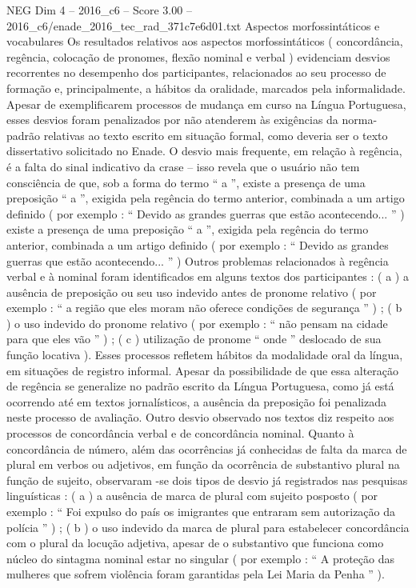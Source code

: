 \begin{textsample}{NEG Dim 4 – 2016\_c6 – Score 3.00 – 2016\_c6/enade\_2016\_tec\_rad\_371c7e6d01.txt}
Aspectos morfossintáticos e vocabulares Os resultados relativos aos aspectos morfossintáticos ( concordância, regência, colocação de pronomes, flexão nominal e verbal ) evidenciam desvios recorrentes no desempenho dos participantes, relacionados ao seu processo de formação e, principalmente, a hábitos da oralidade, marcados pela informalidade.
Apesar de exemplificarem processos de mudança em curso na Língua Portuguesa, esses desvios foram penalizados por não atenderem às exigências da norma-padrão relativas ao texto escrito em situação formal, como deveria ser o texto dissertativo solicitado no Enade.
O desvio mais frequente, em relação à regência, é a falta do sinal indicativo da crase – isso revela que o usuário não tem consciência de que, sob a forma do termo “ a ”, existe a presença de uma preposição “ a ”, exigida pela regência do termo anterior, combinada a um artigo definido ( por exemplo : “ Devido as grandes guerras que estão acontecendo... ” ) existe a presença de uma preposição “ a ”, exigida pela regência do termo anterior, combinada a um artigo definido ( por exemplo : “ Devido as grandes guerras que estão acontecendo... ” ) Outros problemas relacionados à regência verbal e à nominal foram identificados em alguns textos dos participantes : ( a ) a ausência de preposição ou seu uso indevido antes de pronome relativo ( por exemplo : “ a região que eles moram não oferece condições de segurança ” ) ; ( b ) o uso indevido do pronome relativo ( por exemplo : “ não pensam na cidade para que eles vão ” ) ; ( c ) utilização de pronome “ onde ” deslocado de sua função locativa ).
Esses processos refletem hábitos da modalidade oral da língua, em situações de registro informal.
Apesar da possibilidade de que essa alteração de regência se generalize no padrão escrito da Língua Portuguesa, como já está ocorrendo até em textos jornalísticos, a ausência da preposição foi penalizada neste processo de avaliação.
Outro desvio observado nos textos diz respeito aos processos de concordância verbal e de concordância nominal.
Quanto à concordância de número, além das ocorrências já conhecidas de falta da marca de plural em verbos ou adjetivos, em função da ocorrência de substantivo plural na função de sujeito, observaram -se dois tipos de desvio já registrados nas pesquisas linguísticas : ( a ) a ausência de marca de plural com sujeito posposto ( por exemplo : “ Foi expulso do país os imigrantes que entraram sem autorização da polícia ” ) ; ( b ) o uso indevido da marca de plural para estabelecer concordância com o plural da locução adjetiva, apesar de o substantivo que funciona como núcleo do sintagma nominal estar no singular ( por exemplo : “ A proteção das mulheres que sofrem violência foram garantidas pela Lei Maria da Penha ” ).

\end{textsample}
